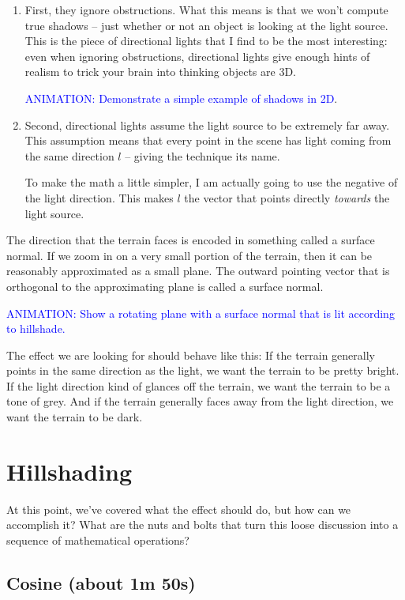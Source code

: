\documentclass{article}
\newcommand\animation[1]{\textcolor{blue}{ANIMATION: #1}}
\begin{document}
\begin{enumerate}

\item First, they ignore obstructions.
What this means is that we won't compute true shadows -- just whether or not an object is looking at the light source.
This is the piece of directional lights that I find to be the most interesting: even when ignoring obstructions, directional lights give enough hints of realism to trick your brain into thinking objects are 3D.

\animation{Demonstrate a simple example of shadows in 2D}.
	
\item Second, directional lights assume the light source to be extremely far away.
This assumption means that every point in the scene has light coming from the same direction $l$ -- giving the technique its name.

To make the math a little simpler, I am actually going to use the negative of the light direction.
This makes $l$ the vector that points directly \textit{towards} the light source.

\end{enumerate}

The direction that the terrain faces is encoded in something called a surface normal.
If we zoom in on a very small portion of the terrain, then it can be reasonably approximated as a small plane.
The outward pointing vector that is orthogonal to the approximating plane is called a surface normal.

\animation{Show a rotating plane with a surface normal that is lit according to hillshade.}

The effect we are looking for should behave like this:
If the terrain generally points in the same direction as the light, we want the terrain to be pretty bright.
If the light direction kind of glances off the terrain, we want the terrain to be a tone of grey.
And if the terrain generally faces away from the light direction, we want the terrain to be dark.

\section{Hillshading}

At this point, we've covered what the effect should do, but how can we accomplish it?
What are the nuts and bolts that turn this loose discussion into a sequence of mathematical operations?

\subsection{Cosine (about 1m 50s)}
\end{document}
